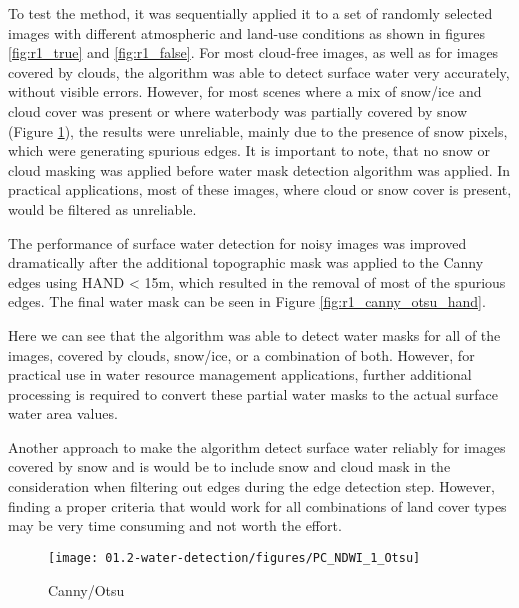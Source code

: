 To test the method, it was sequentially applied it to a set of randomly selected images with different atmospheric and land-use conditions as shown in figures \ref{fig:r1_true} and \ref{fig:r1_false}. For most cloud-free images, as well as for images covered by clouds, the algorithm was able to detect surface water very accurately, without visible errors. However, for most scenes where a mix of snow/ice and cloud cover was present or where waterbody was partially covered by snow (Figure \ref{fig:r1_canny_otsu}), the results were unreliable, mainly due to the presence of snow pixels, which were generating spurious edges. It is important to note, that no snow or cloud masking was applied before water mask detection algorithm was applied. In practical applications, most of these images, where cloud or snow cover is present, would be filtered as unreliable.

The performance of surface water detection for noisy images was improved dramatically after the additional topographic mask was applied to the Canny edges using HAND < 15m, which resulted in the removal of most of the spurious edges. The final water mask can be seen in Figure \ref{fig:r1_canny_otsu_hand}.

Here we can see that the algorithm was able to detect water masks for all of the images, covered by clouds, snow/ice, or a combination of both. However, for practical use in water resource management applications, further additional processing is required to convert these partial water masks to the actual surface water area values.

Another approach to make the algorithm detect surface water reliably for images covered by snow and is would be to include snow and cloud mask in the consideration when filtering out edges during the edge detection step. However, finding a proper criteria that would work for all combinations of land cover types may be very time consuming and not worth the effort.

\begin{comment}
\begin{figure}[H]
	\centering
	\texttt{[image: 01.2-water-detection/figures/PC\_NDWI\_0]}
	\caption{NDWI=0}
	\label{fig:r1_ndwi0}
\end{figure}
\end{comment}

\begin{figure}[H]
	\centering
	\texttt{[image: 01.2-water-detection/figures/PC\_NDWI\_1\_Otsu]}
	\caption{Canny/Otsu}
	\label{fig:r1_canny_otsu}
\end{figure}

